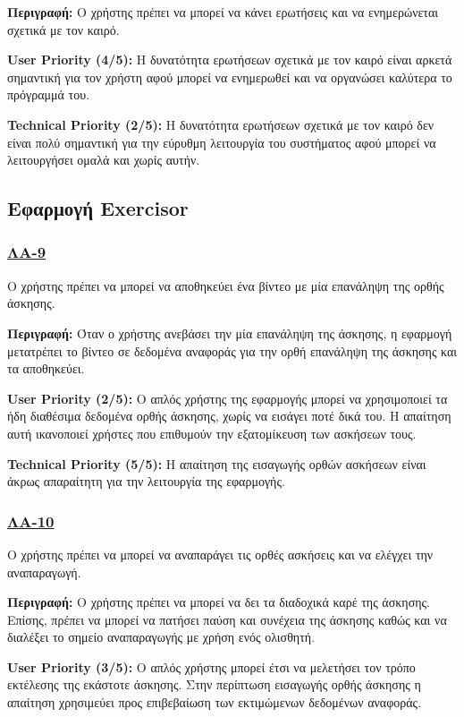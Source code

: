 \noindent\textbf{Περιγραφή:} Ο χρήστης πρέπει να μπορεί να κάνει ερωτήσεις και να ενημερώνεται σχετικά με τον καιρό.

\noindent\textbf{User Priority (4/5):} Η δυνατότητα ερωτήσεων σχετικά με τον καιρό είναι αρκετά σημαντική για τον χρήστη αφού μπορεί να ενημερωθεί και να οργανώσει καλύτερα το πρόγραμμά του.

\noindent\textbf{Technical Priority (2/5):} Η δυνατότητα ερωτήσεων σχετικά με τον καιρό δεν είναι πολύ σημαντική για την εύρυθμη λειτουργία του συστήματος αφού μπορεί να λειτουργήσει ομαλά και χωρίς αυτήν.

\subsection{Εφαρμογή Exercisor}

\subsubsection{\underline{ΛΑ-9}}
\noindent Ο χρήστης πρέπει να μπορεί να αποθηκεύει ένα βίντεο με μία επανάληψη της ορθής άσκησης.

\noindent\textbf{Περιγραφή:} Όταν ο χρήστης ανεβάσει την μία επανάληψη της άσκησης, η εφαρμογή μετατρέπει το βίντεο σε δεδομένα αναφοράς για την ορθή επανάληψη της άσκησης και τα αποθηκεύει.

\noindent\textbf{User Priority (2/5):} Ο απλός χρήστης της εφαρμογής μπορεί να χρησιμοποιεί τα ήδη διαθέσιμα δεδομένα ορθής άσκησης, χωρίς να εισάγει ποτέ δικά του. Η απαίτηση αυτή ικανοποιεί χρήστες που επιθυμούν την εξατομίκευση των ασκήσεων τους.

\noindent\textbf{Technical Priority (5/5):} Η απαίτηση της εισαγωγής ορθών ασκήσεων είναι άκρως απαραίτητη για την λειτουργία της εφαρμογής.

\subsubsection{\underline{ΛΑ-10}}
\noindent Ο χρήστης πρέπει να μπορεί να αναπαράγει τις ορθές ασκήσεις και να ελέγχει την αναπαραγωγή.

\noindent\textbf{Περιγραφή:} Ο χρήστης πρέπει να μπορεί να δει τα διαδοχικά καρέ της άσκησης. Επίσης, πρέπει να μπορεί να πατήσει παύση και συνέχεια της άσκησης καθώς και να διαλέξει το σημείο αναπαραγωγής με χρήση ενός ολισθητή.

\noindent\textbf{User Priority (3/5):} Ο απλός χρήστης μπορεί έτσι να μελετήσει τον τρόπο εκτέλεσης της εκάστοτε άσκησης. Στην περίπτωση εισαγωγής ορθής άσκησης η απαίτηση χρησιμεύει προς επιβεβαίωση των εκτιμώμενων δεδομένων αναφοράς.

